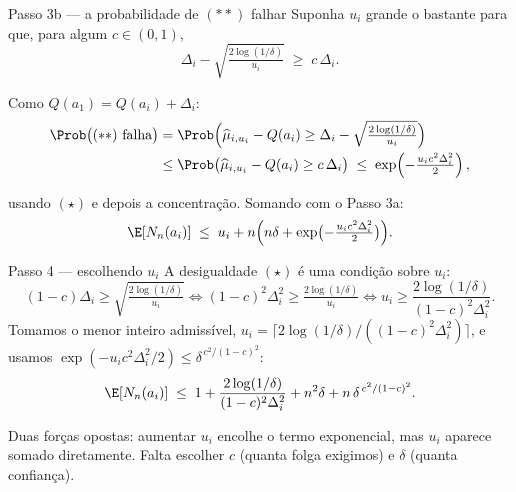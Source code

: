 \documentclass[aspectratio=169, 11pt]{beamer}
\newcommand{\muh}{\widehat{\mu}}
\begin{document}
\begin{frame}{Passo 3b --- a probabilidade de $(**)$ falhar}
  Suponha $u_i$ grande o bastante para que, para algum $c\in(0,1)$,
  \vspace{-0.2em}
  \begin{equation}
    \Delta_i - \sqrt{\tfrac{2\log(1/\delta)}{u_i}} \;\ge\; c\,\Delta_i .
    \tag{$\star$}
  \end{equation}
  \vspace{-1.1em}

  Como $Q(a_1)=Q(a_i)+\Delta_i$:
  \vspace{-0.3em}
  \begin{align*}
    \Prob\bigl((**)\text{ falha}\bigr)
      &= \Prob\Bigl(\muh_{i,u_i}-Q(a_i) \ge \Delta_i - \sqrt{\tfrac{2\log(1/\delta)}{u_i}}\Bigr)\\[-0.1em]
      &\le \Prob\bigl(\muh_{i,u_i}-Q(a_i)\ge c\,\Delta_i\bigr)
        \;\le\; \exp\!\left(-\tfrac{u_i c^{2}\Delta_i^{2}}{2}\right),
  \end{align*}
  \vspace{-0.6em}

  usando $(\star)$ e depois a concentração. Somando com o Passo 3a:
  \vspace{-0.3em}
  \[
    \E[N_n(a_i)] \;\le\; u_i + n\Bigl(n\delta + \exp\bigl(-\tfrac{u_i c^{2}\Delta_i^{2}}{2}\bigr)\Bigr).
  \]
\end{frame}

\begin{frame}{Passo 4 --- escolhendo $u_i$}
  A desigualdade $(\star)$ é uma condição sobre $u_i$:
  \vspace{-0.3em}
  \[
    (1-c)\Delta_i \ge \sqrt{\tfrac{2\log(1/\delta)}{u_i}}
    \iff (1-c)^{2}\Delta_i^{2} \ge \tfrac{2\log(1/\delta)}{u_i}
    \iff u_i \ge \frac{2\log(1/\delta)}{(1-c)^{2}\Delta_i^{2}} .
  \]
  Tomamos o menor inteiro admissível,
  $u_i = \bigl\lceil 2\log(1/\delta)/((1-c)^{2}\Delta_i^{2})\bigr\rceil$, e usamos
  $\exp(-u_i c^{2}\Delta_i^{2}/2) \le \delta^{\,c^{2}/(1-c)^{2}}$:
  \vspace{-0.2em}
  \[
    \E[N_n(a_i)] \;\le\;
      1 + \frac{2\log(1/\delta)}{(1-c)^{2}\Delta_i^{2}}
      + n^{2}\delta + n\,\delta^{\,c^{2}/(1-c)^{2}} .
  \]

  \begin{ideiabox}
    Duas forças opostas: aumentar $u_i$ encolhe o termo exponencial, mas $u_i$
    aparece somado diretamente. Falta escolher $c$ (quanta folga exigimos) e
    $\delta$ (quanta confiança).
  \end{ideiabox}
\end{frame}
\end{document}
